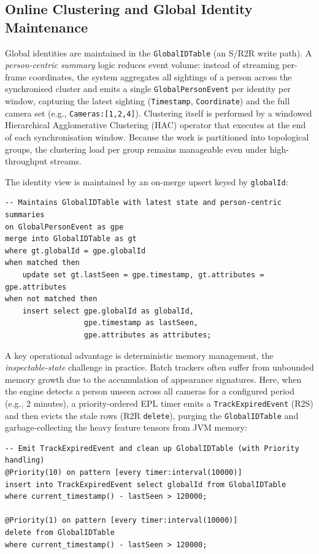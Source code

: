 \documentclass[review]{elsarticle}
\begin{document}
\subsection{Online Clustering and Global Identity Maintenance}
\label{sec:multi:globalid}
Global identities are maintained in the \texttt{GlobalIDTable} (an S/R2R write path). A \emph{person-centric summary} logic reduces event volume: instead of streaming per-frame coordinates, the system aggregates all sightings of a person across the synchronised cluster and emits a single \texttt{GlobalPersonEvent} per identity per window, capturing the latest sighting (\texttt{Timestamp}, \texttt{Coordinate}) and the full camera set (e.g., \texttt{Cameras:[1,2,4]}). Clustering itself is performed by a windowed Hierarchical Agglomerative Clustering (HAC) operator that executes at the end of each synchronisation window. Because the work is partitioned into topological groups, the clustering load per group remains manageable even under high-throughput streams.

The identity view is maintained by an on-merge upsert keyed by \texttt{globalId}:
\begin{verbatim}
-- Maintains GlobalIDTable with latest state and person-centric summaries
on GlobalPersonEvent as gpe
merge into GlobalIDTable as gt
where gt.globalId = gpe.globalId
when matched then
    update set gt.lastSeen = gpe.timestamp, gt.attributes = gpe.attributes
when not matched then
    insert select gpe.globalId as globalId,
                  gpe.timestamp as lastSeen,
                  gpe.attributes as attributes;
\end{verbatim}

A key operational advantage is deterministic memory management, the \emph{inspectable-state} challenge in practice. Batch trackers often suffer from unbounded memory growth due to the accumulation of appearance signatures. Here, when the engine detects a person unseen across all cameras for a configured period (e.g., 2 minutes), a priority-ordered EPL timer emits a \texttt{TrackExpiredEvent} (R2S) and then evicts the stale rows (R2R \texttt{delete}), purging the \texttt{GlobalIDTable} and garbage-collecting the heavy feature tensors from JVM memory:
\begin{verbatim}
-- Emit TrackExpiredEvent and clean up GlobalIDTable (with Priority handling)
@Priority(10) on pattern [every timer:interval(10000)]
insert into TrackExpiredEvent select globalId from GlobalIDTable
where current_timestamp() - lastSeen > 120000;

@Priority(1) on pattern [every timer:interval(10000)]
delete from GlobalIDTable
where current_timestamp() - lastSeen > 120000;
\end{verbatim}
\end{document}
